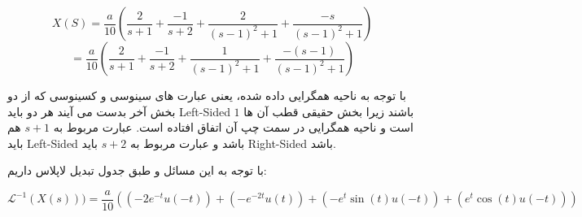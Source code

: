 \documentclass[12pt]{article}
\begin{document}
$$X(S)=\frac{a}{10}(\frac{2}{s+1} + \frac{-1}{s+2} + \frac{2  }{(s-1)^2 + 1} + \frac{- s}{(s-1)^2 +1})$$
$$= \frac{a}{10}(\frac{2}{s+1} + \frac{-1}{s+2} + \frac{1  }{(s-1)^2 + 1} + \frac{- (s-1)}{(s-1)^2 +1})$$

با توجه به ناحیه همگرایی داده شده، یعنی عبارت های سینوسی و کسینوسی که از دو بخش آخر بدست می آیند هر دو باید Left-Sided باشند زیرا بخش حقیقی قطب آن ها $1$ است و ناحیه همگرایی در سمت چپ آن اتفاق افتاده است. عبارت مربوط به $s+1$ هم باید Left-Sided باشد و عبارت مربوط به $s+2$ باید Right-Sided باشد.

با توجه به این مسائل و طبق جدول تبدیل لاپلاس داریم:

$$\mathcal{L}^{-1} (X(s)))=\frac{a}{10}\left((-2 e^{-t} u(-t)) + (- e^{-2t}u(t)) + (-e^t \sin(t) u(-t)) + (e^t \cos(t) u(-t))\right)$$
\end{document}
